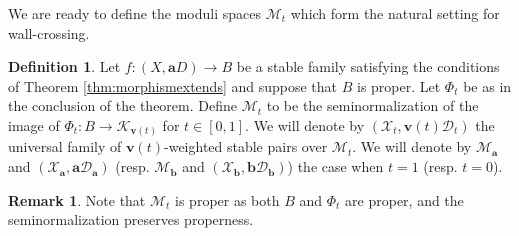 \documentclass[11pt]{amsart}
\theoremstyle{definition}
\newtheorem{definition}[theorem]{Definition}
\newtheorem{remark}[theorem]{Remark}
\theoremstyle{remark}
\newcommand{\calX}{\mathcal X}
\newcommand{\calD}{\mathcal D}
\newcommand{\sK}{\mathscr{K}}
\newcommand{\sM}{\mathscr{M}}
\newcommand{\bfa}{\mathbf{a}}
\newcommand{\bfv}{\mathbf{v}}
\newcommand{\bfb}{\mathbf{b}}
\begin{document}
	
	We are ready to define the moduli spaces $\sM_t$ which form the natural setting for wall-crossing. 
	
	\begin{definition}\label{Def:calM} Let $f: (X, \bfa D) \to B$ be a stable family satisfying the conditions of Theorem \ref{thm:morphismextends} and suppose that $B$ is proper. Let $\Phi_t$ be as in the conclusion of the theorem. Define $\sM_t$ to be the seminormalization of the image of $\Phi_t:B \to \sK_{\mathbf{v}(t)}$ for $t \in [0,1]$. We will denote by $(\calX_t, \bfv(t) \calD_t)$ the universal family of $\bfv(t)$-weighted stable pairs over $\sM_t$. We will denote by $\sM_\bfa$ and $(\calX_\bfa, \bfa \calD_\bfa)$ (resp. $\sM_\bfb$ and $(\calX_\bfb, \bfb\calD_\bfb)$) the case when $t = 1$ (resp. $t = 0$). 
	\end{definition}
	
	\begin{remark}\label{rem:Mt:proper} Note that $\sM_t$ is proper as both $B$ and $\Phi_t$ are proper, and the seminormalization preserves properness. 
	\end{remark}
	
\end{document}
